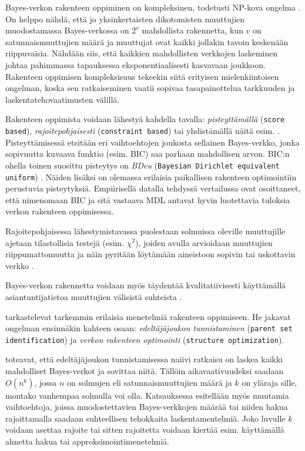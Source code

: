 Bayes-verkon rakenteen oppiminen on kompleksinen, todetusti NP-kova ongelma \citep{chickering_large-sample_2004}. On helppo nähdä, että jo yksinkertaisten dikotomisten muuttujien muodostamassa Bayes-verkossa on $2^v$ mahdollista rakennetta, kun $v$ on satunnaismuuttujien määrä ja muuttujat ovat kaikki jollakin tavoin keskenään riippuvaisia. Nähdään siis, että kaikkien mahdollisten verkkojen laskeminen johtaa pahimmassa tapauksessa eksponentiaalisesti kasvavaan joukkoon. Rakenteen oppimisen kompleksisuus tekeekin siitä erityisen mielenkiintoisen ongelman, koska sen ratkaiseminen vaatii sopivaa tasapainottelua tarkkuuden ja laskentatehovaatimusten välillä.

Rakenteen oppimista voidaan lähestyä kahdella tavalla: \emph{pisteyttämällä} (\texttt{score based}),  \emph{rajoitepohjaisesti} (\texttt{constraint based}) \citep{ramsahai_connecting_2020, scutari_learning_2010} tai yhdistämällä näitä esim. \citet{li_hybrid_2018}. Pisteyttämisessä etsitään eri vaihtoehtojen joukosta sellainen Bayes-verkko, jonka sopivuutta kuvaava funktio (esim. BIC) saa parhaan mahdollisen arvon. BIC:n ohella toinen suosittu pisteytys on \emph{BDeu} (\texttt{Bayesian Dirichlet equivalent uniform})  \citep{scanagatta_survey_2019}. Näiden lisäksi on olemassa erilaisia paikallisen rakenteen optimointiin perustuvia pisteytyksiä. Empiirisellä datalla  tehdyssä vertailussa \citet{liu_empirical_2012} ovat osoittaneet, että nimenomaan BIC ja sitä vastaava MDL antavat hyvin luotettavia tuloksia verkon rakenteen oppimisessa. 

Rajoitepohjaisessa lähestymistavassa puolestaan solmuissa oleville muuttujille ajetaan tilastollisia testejä (esim. $\chi^2$), joiden avulla arvioidaan muuttujien riippumattomuutta ja näin pyritään löytämään aineistoon sopivin tai uskottavin verkko \citep{ramsahai_connecting_2020, scutari_learning_2010}. 

Bayes-verkon rakennetta voidaan myös täydentää kvalitatiivisesti käyttämällä asiantuntijatietoa muuttujien välisistä suhteista \citep{ruggeri_bayesian_2008, myllymaki_bayes-verkkojen_1998}. 

\citet{scanagatta_survey_2019} tarkastelevat tarkemmin erilaisia menetelmiä rakenteen oppimiseen. He jakavat ongelman ensinnäkin kahteen osaan: \emph{edeltäjäjoukon tunnistaminen} (\texttt{parent set identification}) ja \emph{verkon rakenteen optimointi} (\texttt{structure optimization}). 

\citet{scanagatta_survey_2019} toteavat, että edeltäjäjoukon tunnistamisessa naiivi ratkaisu on laskea kaikki mahdolliset Bayes-verkot ja sovittaa niitä. Tällöin aikavaativuudeksi saadaan $O(n^k)$, jossa $n$ on solmujen eli satunnaismuuttujien määrä ja $k$ on yläraja sille, montako vanhempaa solmulla voi olla. Katsauksessa esitellään myös muutamia vaihtoehtoja, joissa muodostettavien Bayes-verkkojen määrää tai niiden hakua rajoittamalla saadaan suhteellisen tehokkaita laskentamentelmiä. Joko luvulle $k$ voidaan asettaa rajoite tai sitten rajoitetta voidaan kiertää esim. käyttämällä ahnetta hakua tai approksimointimenetelmiä.

